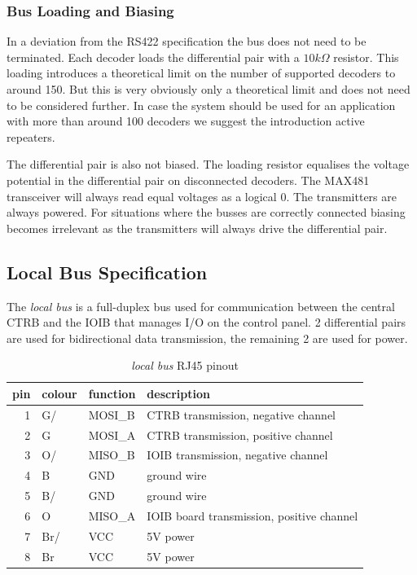 \documentclass{scrreprt}
\begin{document}
\subsubsection {Bus Loading and Biasing}
In a deviation from the RS422 specification the bus does not need to be terminated. Each decoder loads the differential pair with a $10k\Omega$ resistor. This loading introduces a theoretical limit on the number of supported decoders to around 150. But this is very obviously only a theoretical limit and does not need to be considered further. In case the system should be used for an application with more than around 100 decoders we suggest the introduction active repeaters.

The differential pair is also not biased. The loading resistor equalises the voltage potential in the differential pair on disconnected decoders. The MAX481 transceiver will always read equal voltages as a logical $0$. The transmitters are always powered. For situations where the busses are correctly connected biasing becomes irrelevant as the transmitters will always drive the differential pair.

\subsection{Local Bus Specification}
The \emph{local bus} is a full-duplex bus used for communication between the central CTRB and the IOIB that manages I/O on the control panel. 2 differential pairs are used for bidirectional data transmission, the remaining 2 are used for power.

\begin{table}[ht!]
\centering
\begin{tabular}{ |r|l|l|l| }
\hline
pin & colour & function & description \\\hline\hline
  1 & G/     & MOSI\_B  & CTRB transmission, negative channel \\\hline
  2 & G      & MOSI\_A  & CTRB transmission, positive channel \\\hline
  3 & O/     & MISO\_B  & IOIB transmission, negative channel \\\hline
  4 & B      & GND      & ground wire \\\hline
  5 & B/     & GND      & ground wire \\\hline
  6 & O      & MISO\_A  & IOIB board transmission, positive channel \\\hline
  7 & Br/    & VCC      & 5V power \\\hline
  8 & Br     & VCC      & 5V power \\\hline
\end{tabular}
\caption{\emph{local bus} RJ45 pinout}
\end{table}
\end{document}
